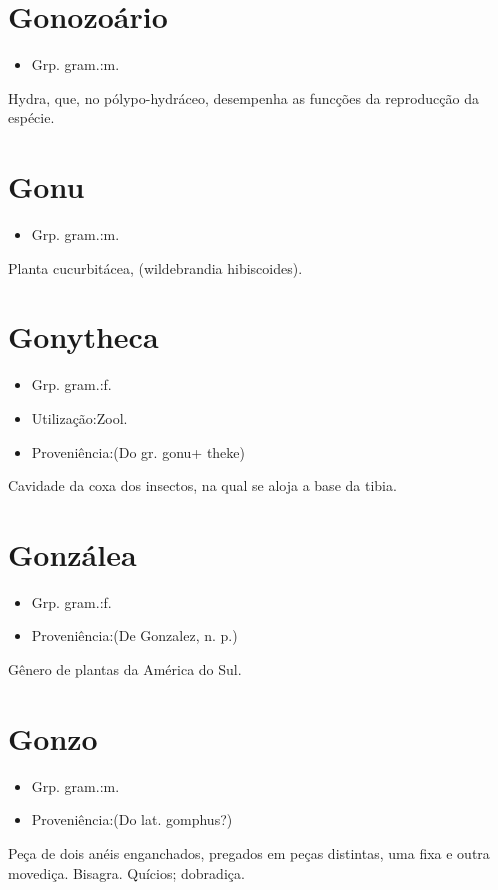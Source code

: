 \section{Gonozoário}
\begin{itemize}
\item {Grp. gram.:m.}
\end{itemize}
Hydra, que, no pólypo-hydráceo, desempenha as funcções da reproducção da espécie.
\section{Gonu}
\begin{itemize}
\item {Grp. gram.:m.}
\end{itemize}
Planta cucurbitácea, (\textunderscore wildebrandia hibiscoides\textunderscore ).
\section{Gonytheca}
\begin{itemize}
\item {Grp. gram.:f.}
\end{itemize}
\begin{itemize}
\item {Utilização:Zool.}
\end{itemize}
\begin{itemize}
\item {Proveniência:(Do gr. \textunderscore gonu\textunderscore  + \textunderscore theke\textunderscore )}
\end{itemize}
Cavidade da coxa dos insectos, na qual se aloja a base da tibia.
\section{Gonzálea}
\begin{itemize}
\item {Grp. gram.:f.}
\end{itemize}
\begin{itemize}
\item {Proveniência:(De \textunderscore Gonzalez\textunderscore , n. p.)}
\end{itemize}
Gênero de plantas da América do Sul.
\section{Gonzo}
\begin{itemize}
\item {Grp. gram.:m.}
\end{itemize}
\begin{itemize}
\item {Proveniência:(Do lat. \textunderscore gomphus\textunderscore ?)}
\end{itemize}
Peça de dois anéis enganchados, pregados em peças distintas, uma fixa e outra movediça.
Bisagra.
Quícios; dobradiça.
